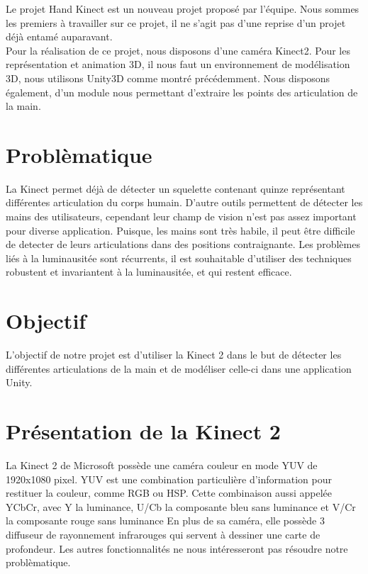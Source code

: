 Le projet \og Hand Kinect \fg est un nouveau projet proposé par 
l'équipe. Nous sommes les premiers à travailler sur ce projet, il 
ne s'agit pas d'une reprise d'un projet déjà entamé auparavant.\\

Pour la réalisation de ce projet, nous disposons d'une caméra Kinect2. 
Pour les représentation et animation 3D, il nous faut un environnement 
de modélisation 3D, nous utilisons Unity3D comme montré précédemment. 
Nous disposons également, d'un module nous permettant d'extraire les 
points des articulation de la main.

\section{Problèmatique}
La Kinect permet déjà de détecter un squelette contenant quinze représentant 
différentes articulation du corps humain. 
D'autre outils permettent de détecter les mains des utilisateurs, cependant leur
champ de vision n'est pas assez important pour diverse application.
Puisque, 
les mains sont très habile, il peut être difficile de detecter de leurs 
articulations dans des positions contraignante. Les problèmes liés à 
la luminausitée sont récurrents, il est souhaitable d'utiliser des 
techniques robustent et invariantent à la luminausitée, et qui restent 
efficace.

\section{Objectif}
L'objectif de notre projet est d'utiliser la Kinect 2 dans le but de détecter les différentes articulations
de la main et de modéliser celle-ci dans une application Unity.

\section{Présentation de la Kinect 2}
La Kinect 2 de Microsoft possède une caméra couleur en mode YUV de 1920x1080 pixel.
YUV est une combination particulière d'information pour restituer la couleur, comme RGB ou HSP.
Cette combinaison aussi appelée YCbCr, avec Y la luminance, U/Cb la composante bleu sans luminance et V/Cr la composante rouge sans luminance
En plus de sa caméra, elle possède 3 diffuseur de rayonnement infrarouges qui servent à dessiner une carte de profondeur.
Les autres fonctionnalités ne nous intéresseront pas résoudre notre problèmatique.\\

